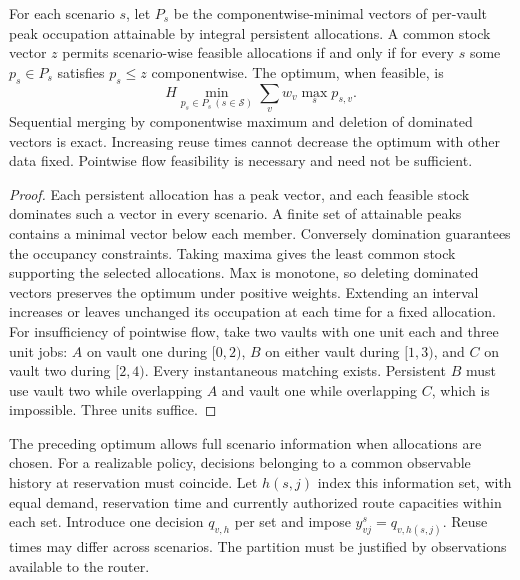 \begin{proposition}
\label{prop:shz-temporal}
For each scenario $s$, let $P_s$ be the componentwise-minimal vectors of per-vault peak occupation attainable by integral persistent allocations. A common stock vector $z$ permits scenario-wise feasible allocations if and only if for every $s$ some $p_s\in P_s$ satisfies $p_s\le z$ componentwise. The optimum, when feasible, is
\[
 H\min_{p_s\in P_s\, (s\in\mathcal S)}\sum_v w_v\max_s p_{s,v}.
\]
Sequential merging by componentwise maximum and deletion of dominated vectors is exact. Increasing reuse times cannot decrease the optimum with other data fixed. Pointwise flow feasibility is necessary and need not be sufficient.
\end{proposition}
\begin{proof}
Each persistent allocation has a peak vector, and each feasible stock dominates such a vector in every scenario. A finite set of attainable peaks contains a minimal vector below each member. Conversely domination guarantees the occupancy constraints. Taking maxima gives the least common stock supporting the selected allocations. Max is monotone, so deleting dominated vectors preserves the optimum under positive weights. Extending an interval increases or leaves unchanged its occupation at each time for a fixed allocation. For insufficiency of pointwise flow, take two vaults with one unit each and three unit jobs: $A$ on vault one during $[0,2)$, $B$ on either vault during $[1,3)$, and $C$ on vault two during $[2,4)$. Every instantaneous matching exists. Persistent $B$ must use vault two while overlapping $A$ and vault one while overlapping $C$, which is impossible. Three units suffice.
\end{proof}

The preceding optimum allows full scenario information when allocations are chosen. For a realizable policy, decisions belonging to a common observable history at reservation must coincide. Let $h(s,j)$ index this information set, with equal demand, reservation time and currently authorized route capacities within each set. Introduce one decision $q_{v,h}$ per set and impose $y^s_{vj}=q_{v,h(s,j)}$. Reuse times may differ across scenarios. The partition must be justified by observations available to the router.

